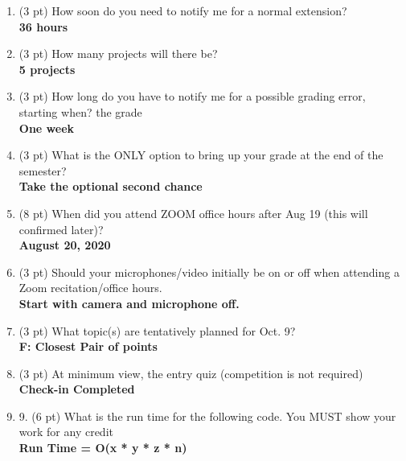 \documentclass[12pt]{article}
\begin{document}
\begin{enumerate}

  \item (3 pt) How soon do you need to notify me for a normal extension? \\
    \textbf{36 hours}

  \item (3 pt) How many projects will there be? \\
    \textbf{5 projects}

  \item (3 pt) How long do you have to notify me for a possible grading error, starting when? the grade \\
    \textbf{One week}

  \item (3 pt) What is the ONLY option to bring up your grade at the end of the semester? \\
    \textbf{Take the optional second chance }

  \item (8 pt) When did you attend ZOOM office hours after Aug 19 (this will confirmed later)? \\
    \textbf{August 20, 2020  }

  \item (3 pt) Should your microphones/video initially be on or off when attending a Zoom recitation/office hours. \\
    \textbf{Start with camera and microphone off.}

  \item (3 pt) What topic(s) are tentatively planned for Oct. 9? \\
    \textbf{F: Closest Pair of points}

  \item (3 pt) At minimum view, the entry quiz (competition is not required) \\
    \textbf{Check-in Completed}

  \item 9. (6 pt) What is the run time for the following code. You MUST show your work for any credit \\ 
    \textbf{Run Time = O(x * y * z * n)}

\end{enumerate}
\end{document}
